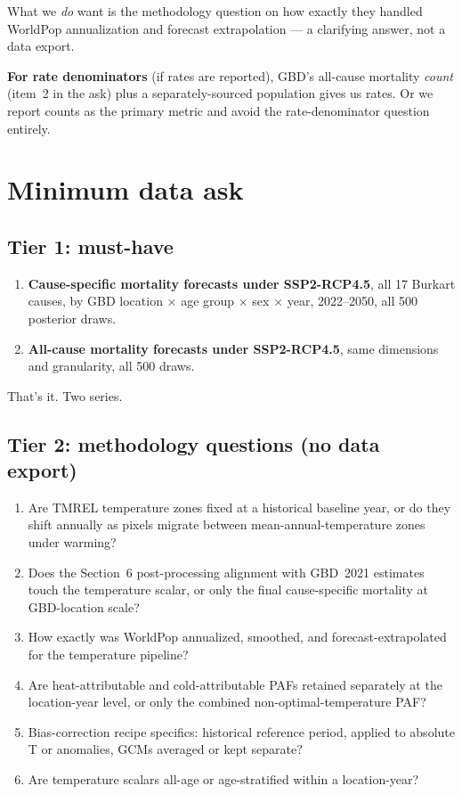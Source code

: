 \documentclass[11pt]{article}
\begin{document}
What we \emph{do} want is the methodology question on how exactly they handled WorldPop annualization and forecast extrapolation --- a clarifying answer, not a data export.

\textbf{For rate denominators} (if rates are reported), GBD's all-cause mortality \emph{count} (item~2 in the ask) plus a separately-sourced population gives us rates. Or we report counts as the primary metric and avoid the rate-denominator question entirely.

\section{Minimum data ask}

\subsection{Tier 1: must-have}

\begin{enumerate}
\item \textbf{Cause-specific mortality forecasts under SSP2-RCP4.5}, all 17 Burkart causes, by GBD location $\times$ age group $\times$ sex $\times$ year, 2022--2050, all 500 posterior draws.
\item \textbf{All-cause mortality forecasts under SSP2-RCP4.5}, same dimensions and granularity, all 500 draws.
\end{enumerate}

That's it. Two series.

\subsection{Tier 2: methodology questions (no data export)}

\begin{enumerate}
\item Are TMREL temperature zones fixed at a historical baseline year, or do they shift annually as pixels migrate between mean-annual-temperature zones under warming?
\item Does the Section~6 post-processing alignment with GBD~2021 estimates touch the temperature scalar, or only the final cause-specific mortality at GBD-location scale?
\item How exactly was WorldPop annualized, smoothed, and forecast-extrapolated for the temperature pipeline?
\item Are heat-attributable and cold-attributable PAFs retained separately at the location-year level, or only the combined non-optimal-temperature PAF?
\item Bias-correction recipe specifics: historical reference period, applied to absolute T or anomalies, GCMs averaged or kept separate?
\item Are temperature scalars all-age or age-stratified within a location-year?
\end{enumerate}
\end{document}
